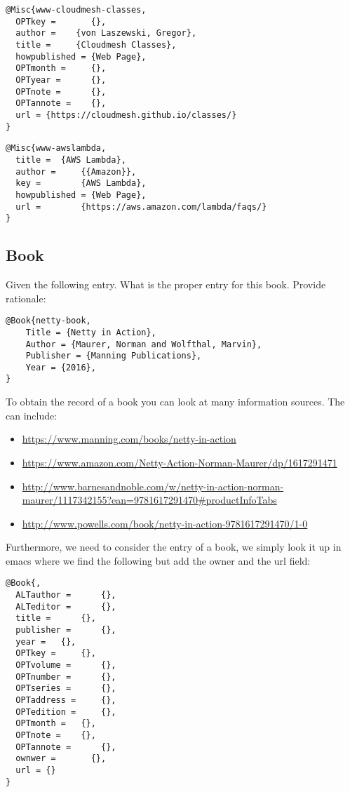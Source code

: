 \begin{verbatim}
@Misc{www-cloudmesh-classes,
  OPTkey =       {},
  author =    {von Laszewski, Gregor},
  title =     {Cloudmesh Classes},
  howpublished = {Web Page},
  OPTmonth =     {},
  OPTyear =      {},
  OPTnote =      {},
  OPTannote =    {},
  url = {https://cloudmesh.github.io/classes/}
}
\end{verbatim}

\begin{verbatim}
@Misc{www-awslambda,
  title =  {AWS Lambda},
  author =     {{Amazon}},
  key =        {AWS Lambda},
  howpublished = {Web Page},
  url =        {https://aws.amazon.com/lambda/faqs/}
}
\end{verbatim}

\subsection{Book}\label{s:e:book}

Given the following entry. What is the proper entry for this book.
Provide rationale:

\begin{verbatim}
@Book{netty-book,
    Title = {Netty in Action},
    Author = {Maurer, Norman and Wolfthal, Marvin},
    Publisher = {Manning Publications},
    Year = {2016},
}
\end{verbatim}

To obtain the record of a book you can look at many information sources.
The can include:

\begin{itemize}

\item
  \url{https://www.manning.com/books/netty-in-action}
\item
  \url{https://www.amazon.com/Netty-Action-Norman-Maurer/dp/1617291471}
\item
  \url{http://www.barnesandnoble.com/w/netty-in-action-norman-maurer/1117342155?ean=9781617291470\#productInfoTabs}
\item
  \url{http://www.powells.com/book/netty-in-action-9781617291470/1-0}
\end{itemize}

Furthermore, we need to consider the entry of a book, we simply look it
up in emacs where we find the following but add the owner and the url
field:

\begin{verbatim}
@Book{,
  ALTauthor =      {},
  ALTeditor =      {},
  title =      {},
  publisher =      {},
  year =   {},
  OPTkey =     {},
  OPTvolume =      {},
  OPTnumber =      {},
  OPTseries =      {},
  OPTaddress =     {},
  OPTedition =     {},
  OPTmonth =   {},
  OPTnote =    {},
  OPTannote =      {},
  ownwer =       {},
  url = {}
}
\end{verbatim}

